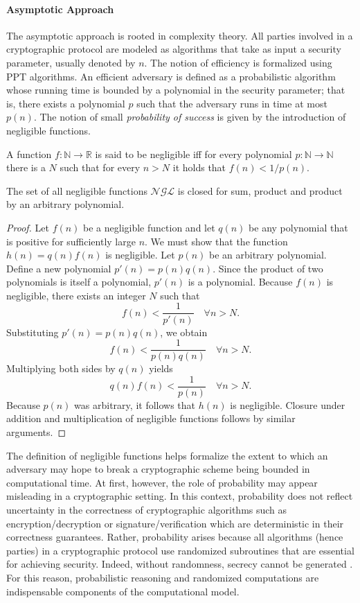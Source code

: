 \paragraph{Asymptotic Approach}
The asymptotic approach is rooted in complexity theory. All parties involved in a cryptographic protocol are modeled as algorithms that take as input a security parameter, usually denoted by 
$n$. The notion of efficiency is formalized using PPT algorithms. An efficient adversary is defined as a probabilistic algorithm whose running time is bounded by a polynomial in the security parameter; that is, there exists a polynomial $p$ such that the adversary runs in time at most $p(n)$. The notion of small \textit{probability of success} is given by the introduction of negligible functions.

\begin{definition}
A function $f: \mathbb{N} \to \mathbb{R}$ is said to be negligible iff for every polynomial $p: \mathbb{N} \to \mathbb{N}$ there is a $N$ such that for every $n > N$ it holds that $f(n) < 1/p(n)$. 
\end{definition}

\begin{lemma}\label{lemma:closure-ngl}
   The set of all negligible functions $\mathcal{NGL}$ is closed for sum, product and product by an arbitrary polynomial.
\end{lemma}
\begin{proof}
Let $f(n)$ be a negligible function and let $q(n)$ be any polynomial that is positive for sufficiently large $n$. We must show that the function $h(n) = q(n) f(n)$ is negligible. Let $p(n)$ be an arbitrary polynomial. Define a new polynomial $p'(n) = p(n) q(n)$. Since the product of two polynomials is itself a polynomial, $p'(n)$ is a polynomial. Because $f(n)$ is negligible, there exists an integer $N$ such that
\[ f(n) < \frac{1}{p'(n)} \quad \forall n > N. \]
Substituting $p'(n) = p(n) q(n)$, we obtain
\[ f(n) < \frac{1}{p(n) q(n)} \quad \forall n > N. \]
Multiplying both sides by $q(n)$ yields
\[ q(n) f(n) < \frac{1}{p(n)} \quad \forall n > N. \]
Because $p(n)$ was arbitrary, it follows that $h(n)$ is negligible. Closure under addition and multiplication of negligible functions follows by similar arguments.
\end{proof}

The definition of negligible functions helps formalize the extent to which an adversary may hope to break a cryptographic scheme being bounded in computational time. At first, however, the role of probability may appear misleading in a cryptographic setting. In this context, probability does not reflect uncertainty in the correctness of cryptographic algorithms such as encryption/decryption or signature/verification which are deterministic in their correctness guarantees. Rather, probability arises because all algorithms (hence parties) in a cryptographic protocol use randomized subroutines that are essential for achieving security. Indeed, without randomness, secrecy cannot be generated \cite{theory-of-computing}. For this reason, probabilistic reasoning and randomized computations are indispensable components of the computational model. 

